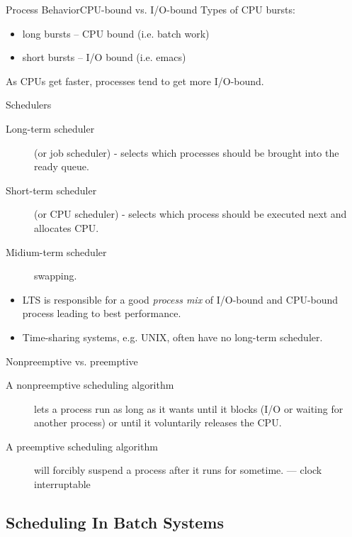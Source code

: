 \begin{frame}{Process Behavior}{CPU-bound vs. I/O-bound}
  Types of CPU bursts:
  \begin{itemize}
  \item long bursts -- CPU bound (i.e. batch work)
  \item short bursts -- I/O bound (i.e. emacs)
  \end{itemize}
  \begin{center}
  \end{center}
  As CPUs get faster, processes tend to get more I/O-bound.
\end{frame}

\begin{frame}{Schedulers}
  \begin{description}
  \item[Long-term scheduler] (or job scheduler) - selects which processes should be brought into the
    ready queue.
  \item[Short-term scheduler] (or CPU scheduler) - selects which process should be executed next and
    allocates CPU.
  \item[Midium-term scheduler] swapping.
  \end{description}
  \begin{itemize}
  \item LTS is responsible for a good \emph{process mix} of I/O-bound and CPU-bound process leading
    to best performance.
  \item Time-sharing systems, e.g. UNIX, often have no long-term scheduler.
  \end{itemize}
\end{frame}

\begin{frame}{Nonpreemptive vs. preemptive}
  \begin{description}
  \item[A nonpreemptive scheduling algorithm] lets a process run as long as it wants until it
    blocks (I/O or waiting for another process) or until it voluntarily releases the CPU. 
  \item[A preemptive scheduling algorithm] will forcibly suspend a process after it runs for
    sometime. --- clock interruptable
  \end{description}
\end{frame}

\subsection{Scheduling In Batch Systems}
\label{sec:sched-batch-syst}

